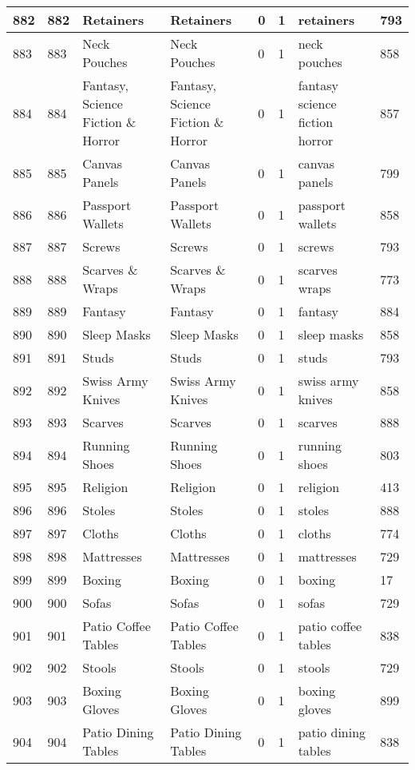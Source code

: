 \begin{longtable}{|l|l|l|l|l|l|l|l|}
882 & 882 & Retainers & Retainers & 0 & 1 & retainers & 793 \\ \hline 
883 & 883 & Neck Pouches & Neck Pouches & 0 & 1 & neck pouches & 858 \\ \hline 
884 & 884 & Fantasy, Science Fiction \& Horror & Fantasy, Science Fiction \& Horror & 0 & 1 & fantasy science fiction horror & 857 \\ \hline 
885 & 885 & Canvas Panels & Canvas Panels & 0 & 1 & canvas panels & 799 \\ \hline 
886 & 886 & Passport Wallets & Passport Wallets & 0 & 1 & passport wallets & 858 \\ \hline 
887 & 887 & Screws & Screws & 0 & 1 & screws & 793 \\ \hline 
888 & 888 & Scarves \& Wraps & Scarves \& Wraps & 0 & 1 & scarves wraps & 773 \\ \hline 
889 & 889 & Fantasy & Fantasy & 0 & 1 & fantasy & 884 \\ \hline 
890 & 890 & Sleep Masks & Sleep Masks & 0 & 1 & sleep masks & 858 \\ \hline 
891 & 891 & Studs & Studs & 0 & 1 & studs & 793 \\ \hline 
892 & 892 & Swiss Army Knives & Swiss Army Knives & 0 & 1 & swiss army knives & 858 \\ \hline 
893 & 893 & Scarves & Scarves & 0 & 1 & scarves & 888 \\ \hline 
894 & 894 & Running Shoes & Running Shoes & 0 & 1 & running shoes & 803 \\ \hline 
895 & 895 & Religion & Religion & 0 & 1 & religion & 413 \\ \hline 
896 & 896 & Stoles & Stoles & 0 & 1 & stoles & 888 \\ \hline 
897 & 897 & Cloths & Cloths & 0 & 1 & cloths & 774 \\ \hline 
898 & 898 & Mattresses & Mattresses & 0 & 1 & mattresses & 729 \\ \hline 
899 & 899 & Boxing & Boxing & 0 & 1 & boxing & 17 \\ \hline 
900 & 900 & Sofas & Sofas & 0 & 1 & sofas & 729 \\ \hline 
901 & 901 & Patio Coffee Tables & Patio Coffee Tables & 0 & 1 & patio coffee tables & 838 \\ \hline 
902 & 902 & Stools & Stools & 0 & 1 & stools & 729 \\ \hline 
903 & 903 & Boxing Gloves & Boxing Gloves & 0 & 1 & boxing gloves & 899 \\ \hline 
904 & 904 & Patio Dining Tables & Patio Dining Tables & 0 & 1 & patio dining tables & 838 \\ \hline 

\end{longtable}
